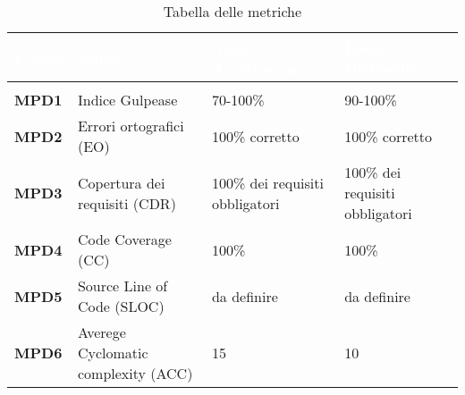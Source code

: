 \renewcommand{\arraystretch}{1.5}
\renewcommand\extrarowheight{1.5pt}
\begin{longtable}{C{1.5cm} | C{4.5cm} C{5cm} C{5cm}}
		\textcolor{white}{\textbf{Codice}} & 
		\textcolor{white}{\textbf{Nome}} & 
		\textcolor{white}{\textbf{Range Accettazione}} & 
		\textcolor{white}{\textbf{Range Ottimalità}} \\
		\endfirsthead
		\\
	    \endfoot
	    \caption{Tabella delle metriche}
	    \endlastfoot
		\hline
		\textbf{MPD1} & 
		Indice Gulpease & 
		70-100\% & 
		90-100\% \\
		\textbf{MPD2} & 
		Errori ortografici (EO) & 
		100\% corretto & 
		100\% corretto \\
		\textbf{MPD3} & 
		Copertura dei requisiti (CDR) & 
		100\% dei requisiti obbligatori &
		100\% dei requisiti obbligatori \\
		\textbf{MPD4} & 
		Code Coverage (CC) & 
		100\% &
		100\% \\
		\textbf{MPD5} & 
		Source Line of Code (SLOC) & 
		da definire &
		da definire \\
		\textbf{MPD6} & 
		Averege Cyclomatic complexity (ACC) & 
		15 &
		10 \\
\end{longtable}
